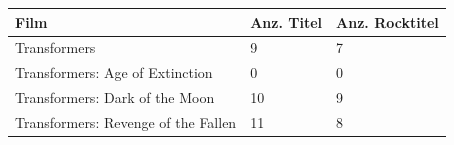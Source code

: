 \documentclass[parskip]{scrartcl}
\begin{document}
\pagebreak
{}
\label{tab:resultLastFm}
\begin{tabular}{p{}|C{0.18\textwidth}|C{0.25\textwidth}}
    \textbf{Film} & \textbf{Anz. Titel} & \textbf{Anz. Rocktitel} \\ \hline
    Transformers & 9 & 7 \\
    Transformers: Age of Extinction & 0 & 0 \\
    Transformers: Dark of the Moon & 10 & 9 \\
    Transformers: Revenge of the Fallen & 11 & 8\\
\end{tabular}







\end{document}
